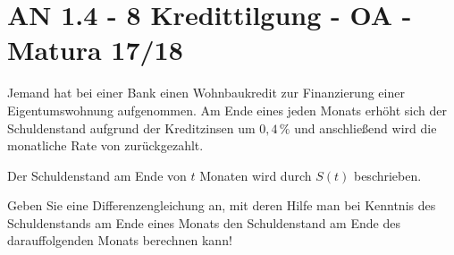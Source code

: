 \section{AN 1.4 - 8 Kredittilgung - OA - Matura 17/18}

\begin{beispiel}[AN 1.4]{1} %
Jemand hat bei einer Bank einen Wohnbaukredit zur Finanzierung einer Eigentumswohnung aufgenommen. Am Ende eines jeden Monats erhöht sich der Schuldenstand aufgrund der Kreditzinsen um $0,4\,\%$ und anschließend wird die monatliche Rate von  zurückgezahlt.

Der Schuldenstand am Ende von $t$ Monaten wird durch $S(t)$ beschrieben.

Geben Sie eine Differenzengleichung an, mit deren Hilfe man bei Kenntnis des Schuldenstands am Ende eines Monats den Schuldenstand am Ende des darauffolgenden Monats berechnen kann!

\end{beispiel}